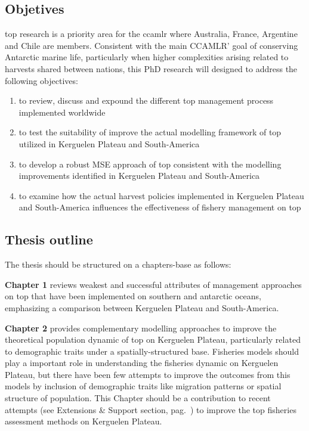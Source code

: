 \subsection*{Objetives}
\label{subsec:objetives}

\acl{top} research is a priority area for the \ac{ccamlr} where Australia, France, Argentine and Chile are members. Consistent with the main CCAMLR’ goal of conserving Antarctic marine life, particularly when higher complexities arising related to harvests shared between nations, this PhD research will designed to address the following objectives:

\begin{enumerate}
\item to review, discuss and expound the different \acl{top} management process implemented worldwide 
\item to test the suitability of improve the actual modelling framework of \acl{top} utilized in Kerguelen Plateau and South-America
\item to develop a robust MSE approach of \acl{top} consistent with the modelling improvements identified in Kerguelen Plateau and South-America
\item to examine how the actual harvest policies implemented in Kerguelen Plateau and South-America influences the effectiveness of fishery management on \acl{top}
\end{enumerate}

\subsection*{Thesis outline}
\label{subsec:layout}

The thesis should be structured on a chapters-base as follows:

\textbf{Chapter 1} reviews weakest and successful attributes of management approaches on \acl{top} that have been implemented on southern and antarctic oceans, emphasizing a comparison between Kerguelen Plateau and South-America. 

\textbf{Chapter 2} provides complementary modelling approaches to improve the theoretical population dynamic of \acl{top} on Kerguelen Plateau, particularly related to demographic traits under a spatially-structured base. Fisheries models should play a important role in understanding the fisheries dynamic on Kerguelen Plateau, but there have been few attempts to improve the outcomes from this models by inclusion of demographic traits like migration patterns or spatial structure of population. This Chapter should be a contribution to  recent attempts (see Extensions \& Support section, pag.~\pageref{subsec:extsupp}) to improve the \acl{top} fisheries assessment methods on Kerguelen Plateau.

